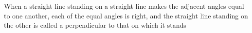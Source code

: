 \documentclass[preview]{standalone}
\begin{document}
\begin{center}
When a straight line standing on a straight line makes the adjacent angles equal to one another, each of the equal angles is right, and the straight line standing on the other is called a perpendicular to that on which it stands
\end{center}
\end{document}
